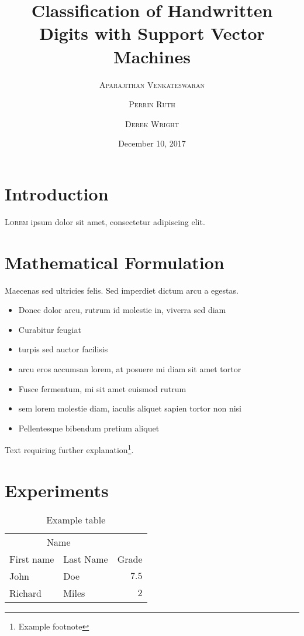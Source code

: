 \documentclass[twoside,twocolumn]{article}
\title{Classification of Handwritten Digits with Support Vector Machines} %
\author{%
\textsc{Aparajithan Venkateswaran} \\[1ex] %
\and %
\textsc{Perrin Ruth} \\[1ex] %
\and %
\textsc{Derek Wright} \\[1ex] %
}
\date{December 10, 2017} %
\begin{document}
\maketitle

%
%

\section{Introduction}

\lettrine[nindent=0em,lines=3]{L}{orem} ipsum dolor sit amet, consectetur adipiscing elit.
\blindtext %

\blindtext %


\section{Mathematical Formulation}

Maecenas sed ultricies felis. Sed imperdiet dictum arcu a egestas. 
\begin{itemize}
\item Donec dolor arcu, rutrum id molestie in, viverra sed diam
\item Curabitur feugiat
\item turpis sed auctor facilisis
\item arcu eros accumsan lorem, at posuere mi diam sit amet tortor
\item Fusce fermentum, mi sit amet euismod rutrum
\item sem lorem molestie diam, iaculis aliquet sapien tortor non nisi
\item Pellentesque bibendum pretium aliquet
\end{itemize}
\blindtext %

Text requiring further explanation\footnote{Example footnote}.


\section{Experiments}

\begin{table}
\caption{Example table}
\centering
\begin{tabular}{llr}
\toprule
\multicolumn{2}{c}{Name} \\
\cmidrule(r){1-2}
First name & Last Name & Grade \\
\midrule
John & Doe & $7.5$ \\
Richard & Miles & $2$ \\
\bottomrule
\end{tabular}
\end{table}
\end{document}
